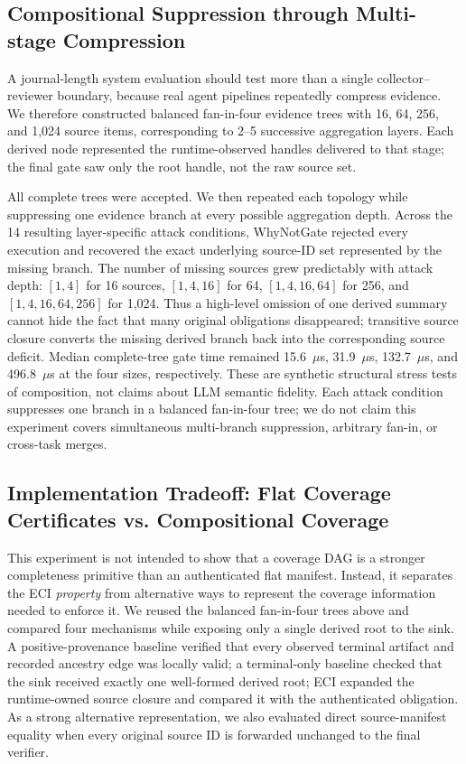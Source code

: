 \documentclass[journal,compsoc]{IEEEtran}
\begin{document}
\subsection{Compositional Suppression through Multi-stage Compression}
A journal-length system evaluation should test more than a single collector--reviewer boundary, because real agent pipelines repeatedly compress evidence. We therefore constructed balanced fan-in-four evidence trees with 16, 64, 256, and 1,024 source items, corresponding to 2--5 successive aggregation layers. Each derived node represented the runtime-observed handles delivered to that stage; the final gate saw only the root handle, not the raw source set.

All complete trees were accepted. We then repeated each topology while suppressing one evidence branch at every possible aggregation depth. Across the 14 resulting layer-specific attack conditions, WhyNotGate rejected every execution and recovered the exact underlying source-ID set represented by the missing branch. The number of missing sources grew predictably with attack depth: $[1,4]$ for 16 sources, $[1,4,16]$ for 64, $[1,4,16,64]$ for 256, and $[1,4,16,64,256]$ for 1,024. Thus a high-level omission of one derived summary cannot hide the fact that many original obligations disappeared; transitive source closure converts the missing derived branch back into the corresponding source deficit. Median complete-tree gate time remained 15.6~$\mu$s, 31.9~$\mu$s, 132.7~$\mu$s, and 496.8~$\mu$s at the four sizes, respectively. These are synthetic structural stress tests of composition, not claims about LLM semantic fidelity. Each attack condition suppresses one branch in a balanced fan-in-four tree; we do not claim this experiment covers simultaneous multi-branch suppression, arbitrary fan-in, or cross-task merges.

\subsection{Implementation Tradeoff: Flat Coverage Certificates vs. Compositional Coverage}
This experiment is not intended to show that a coverage DAG is a stronger completeness primitive than an authenticated flat manifest. Instead, it separates the ECI \emph{property} from alternative ways to represent the coverage information needed to enforce it. We reused the balanced fan-in-four trees above and compared four mechanisms while exposing only a single derived root to the sink. A positive-provenance baseline verified that every observed terminal artifact and recorded ancestry edge was locally valid; a terminal-only baseline checked that the sink received exactly one well-formed derived root; ECI expanded the runtime-owned source closure and compared it with the authenticated obligation. As a strong alternative representation, we also evaluated direct source-manifest equality when every original source ID is forwarded unchanged to the final verifier.
\end{document}
